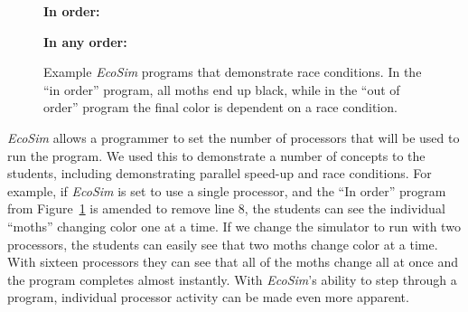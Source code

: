 \documentclass{sig-alternate}
\newcommand{\INDSTATE}[1][1]{\STATE\hspace{#1\algorithmicindent}}
\begin{document}
     
\begin{figure}
\begin{algorithmic}[1]\sf
\item[{\bf In order:}]
  \INDSTATE{a position}
  \INDSTATE{a color}
\STATE{}
  \INDSTATE{do in order}
  \INDSTATE[2]{replace the moth's color with gray}
  \INDSTATE[2]{replace the moth's color with black}
\end{algorithmic}

\begin{algorithmic}[1]\sf
\item[{\bf In any order:}]
  \INDSTATE{a position}
  \INDSTATE{a color}
\STATE{}
  \INDSTATE{do in any order}
  \INDSTATE[2]{replace the moth's color with gray}
  \INDSTATE[2]{replace the moth's color with black}
\end{algorithmic} 
\caption{Example \emph{EcoSim} programs that demonstrate race conditions.  In the
``in order'' program, all moths end up black, while in the ``out of order'' program
the final color is dependent on a race condition.}
\label{fig:race-conditions} 
\end{figure}

\emph{EcoSim} allows a programmer to set the number of processors that will be used to run the
program. We used this to demonstrate a number of concepts to the students, including demonstrating
parallel speed-up and race conditions.  For example, if \emph{EcoSim} is set to use a single
processor, and the ``In order'' program from Figure~\ref{fig:race-conditions} is amended to remove
line 8, the students can see the individual ``moths'' changing color one at a time.  If we change
the simulator to run with two processors, the students can easily see that two moths change color
at a time.  With sixteen processors they can see that all of the moths change all at once and the
program completes almost instantly.  With \emph{EcoSim}'s ability to step through a program, 
individual processor activity can be made even more apparent.
\end{document}
